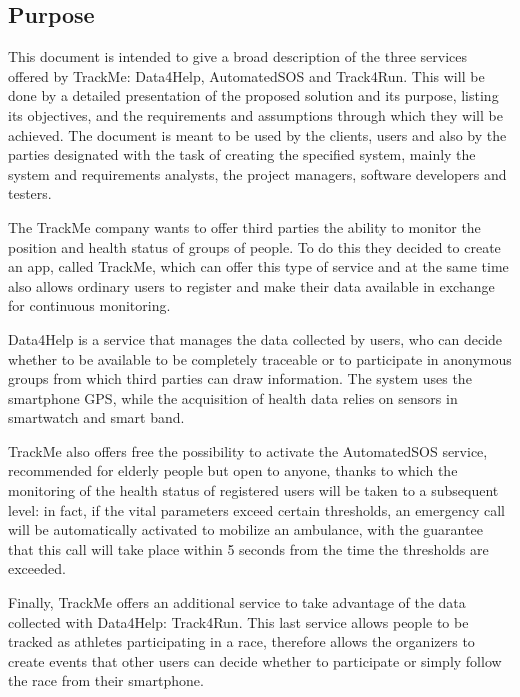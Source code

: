 
%

\subsection{Purpose}
This document is intended to give a broad description of the three services offered by TrackMe: Data4Help, AutomatedSOS and Track4Run. This will be done by a detailed presentation of the proposed solution and its purpose, listing its objectives, and the requirements and assumptions through which they will be achieved. The document is meant to be used by the clients, users and also by the parties designated with the task of creating the specified system, mainly the system and requirements analysts, the project managers, software developers and testers.\newline

The TrackMe company wants to offer third parties the ability to monitor the position and health status of groups of people. To do this they decided to create an app, called TrackMe, which can offer this type of service and at the same time also allows ordinary users to register and make their data available in exchange for continuous monitoring.

Data4Help is a service that manages the data collected by users, who can decide whether to be available to be completely traceable or to participate in anonymous groups from which third parties can draw information. The system uses the smartphone GPS, while the acquisition of health data relies on sensors in smartwatch and smart band.

TrackMe also offers free the possibility to activate the AutomatedSOS service, recommended for elderly people but open to anyone, thanks to which the monitoring of the health status of registered users will be taken to a subsequent level: in fact, if the vital parameters exceed certain thresholds, an emergency call will be automatically activated to mobilize an ambulance, with the guarantee that this call will take place within 5 seconds from the time the thresholds are exceeded.

Finally, TrackMe offers an additional service to take advantage of the data collected with Data4Help: Track4Run. This last service allows people to be tracked as athletes participating in a race, therefore allows the organizers to create events that other users can decide whether to participate or simply follow the race from their smartphone.

